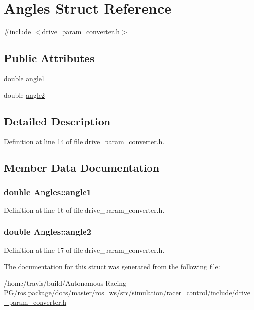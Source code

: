 \hypertarget{struct_angles}{}\section{Angles Struct Reference}
\label{struct_angles}


{\ttfamily \#include $<$drive\+\_\+param\+\_\+converter.\+h$>$}

\subsection*{Public Attributes}
\begin{DoxyCompactItemize}
\item 
double \hyperlink{struct_angles_aa9239b8cf304265e0e3f112b1266370e}{angle1}
\item 
double \hyperlink{struct_angles_af494673bb664c13554551fc881e2eca5}{angle2}
\end{DoxyCompactItemize}


\subsection{Detailed Description}


Definition at line 14 of file drive\+\_\+param\+\_\+converter.\+h.



\subsection{Member Data Documentation}
\subsubsection[{\texorpdfstring{angle1}{angle1}}]{\setlength{\rightskip}{0pt plus 5cm}double Angles\+::angle1}\hypertarget{struct_angles_aa9239b8cf304265e0e3f112b1266370e}{}\label{struct_angles_aa9239b8cf304265e0e3f112b1266370e}


Definition at line 16 of file drive\+\_\+param\+\_\+converter.\+h.

\subsubsection[{\texorpdfstring{angle2}{angle2}}]{\setlength{\rightskip}{0pt plus 5cm}double Angles\+::angle2}\hypertarget{struct_angles_af494673bb664c13554551fc881e2eca5}{}\label{struct_angles_af494673bb664c13554551fc881e2eca5}


Definition at line 17 of file drive\+\_\+param\+\_\+converter.\+h.



The documentation for this struct was generated from the following file\+:\begin{DoxyCompactItemize}
\item 
/home/travis/build/\+Autonomous-\/\+Racing-\/\+P\+G/ros.\+package/docs/master/ros\+\_\+ws/src/simulation/racer\+\_\+control/include/\hyperlink{drive__param__converter_8h}{drive\+\_\+param\+\_\+converter.\+h}\end{DoxyCompactItemize}
